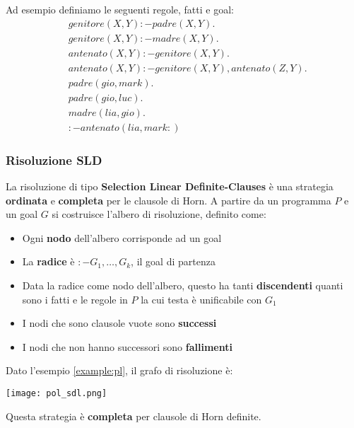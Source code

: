 \begin{example}
	\label{example:pl}
	Ad esempio definiamo le seguenti regole, fatti e goal:
	\begin{align*}
		&genitore(X, Y) :- padre(X,Y).\\
		&genitore(X, Y) :- madre(X,Y).\\
		&antenato(X, Y) :- genitore(X,Y).\\
		&antenato(X, Y) :- genitore(X,Y), antenato(Z, Y).\\
		& padre(gio, mark).\\
		& padre(gio, luc).\\
		& madre(lia, gio).\\
		&:- antenato(lia, mark:)
	\end{align*}
\end{example}

\subsubsection{Risoluzione SLD}
La risoluzione di tipo \textbf{Selection Linear Definite-Clauses} è una strategia \textbf{ordinata} e \textbf{completa} per le clausole di Horn. A partire da un programma $P$ e un goal $G$ si costruisce l'albero di risoluzione, definito come:
\begin{itemize}
	\item Ogni \textbf{nodo} dell'albero corrisponde ad un goal
	\item La \textbf{radice} è $:- G_1, \ldots, G_k$, il goal di partenza
	\item Data la radice come nodo dell'albero, questo ha tanti \textbf{discendenti} quanti sono i fatti e le regole in $P$ la cui testa è unificabile con $G_1$
	\item I nodi che sono clausole vuote sono \textbf{successi}
	\item I nodi che non hanno successori sono \textbf{fallimenti}
\end{itemize}

\begin{example}
	Dato l'esempio \ref{example:pl}, il grafo di risoluzione è:
	\begin{center}
		\texttt{[image: pol\_sdl.png]}
	\end{center}
\end{example}

Questa strategia è \textbf{completa} per clausole di Horn definite.